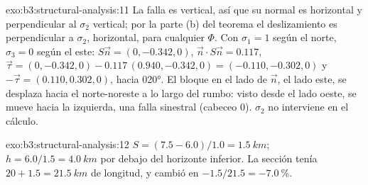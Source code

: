 \begin{solution}{exo:b3:structural-analysis:11}
La falla es vertical, así que su normal es horizontal y perpendicular al
$\sigma_2$ vertical; por la parte (b) del teorema el deslizamiento es perpendicular a
$\sigma_2$, horizontal, para cualquier $\Phi$. Con $\sigma_1 = 1$ según el norte,
$\sigma_3 = 0$ según el este: $S\vec n = (0, -0.342, 0)$, $\vec n\cdot S\vec n =
0.117$, $\vec\tau = (0, -0.342, 0) - 0.117\,(0.940, -0.342, 0) = (-0.110,
-0.302, 0)$ y $-\vec\tau = (0.110, 0.302, 0)$, hacia \ang{020}. El bloque
en el lado de $\vec n$, el lado este, se desplaza hacia el norte-noreste a lo largo
del rumbo: visto desde el lado oeste, se mueve hacia la izquierda, una falla sinestral (cabeceo
0). $\sigma_2$ no interviene en el cálculo.
\end{solution}

\begin{solution}{exo:b3:structural-analysis:12}
$S = (7.5 - 6.0)/1.0 = \qty{1.5}{km}$; $h = 6.0/1.5 = \qty{4.0}{km}$ por debajo del
horizonte inferior. La sección tenía $20 + 1.5 = \qty{21.5}{km}$ de longitud, y cambió
en $-1.5/21.5 = \qty{-7.0}{\percent}$.
\end{solution}

